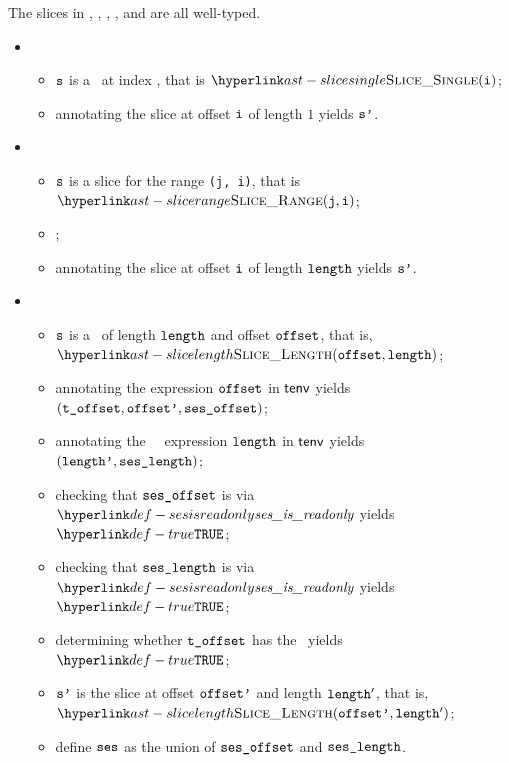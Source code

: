 The slices in
,
,
,
, and
are all well-typed.

\ProseParagraph
\OneApplies
\begin{itemize}
  \item {}
  \begin{itemize}
    \item $\texttt{s}$ is a \singleslice\ at index \vi, that is $\SliceSingle(\vi)$;
    \item annotating the slice at offset $\texttt{i}$ of length $1$ yields $\texttt{s'}$\ProseOrTypeError.
  \end{itemize}

  \item {}
  \begin{itemize}
    \item $\texttt{s}$ is a slice for the range \texttt{(j, i)}, that is $\SliceRange(\vj, \vi)$;
    \item {};
    \item annotating the slice at offset $\texttt{i}$ of length $\texttt{length}$ yields $\texttt{s'}$\ProseOrTypeError.
  \end{itemize}

  \item {}
  \begin{itemize}
    \item $\texttt{s}$ is a \lengthslice\ of length $\texttt{length}$ and offset $\texttt{offset}$, that is, \\
          $\SliceLength(\eoffset, \elength)$;
    \item annotating the expression $\texttt{offset}$ in $\textsf{tenv}$ yields \\
          $(\texttt{t\_offset}, \texttt{offset'}, \texttt{ses\_offset})$\ProseOrTypeError;
    \item annotating the \symbolicallyevaluable\ \constrainedinteger\ expression $\texttt{length}$ in $\textsf{tenv}$ yields
    $(\texttt{length'}, \texttt{ses\_length})$\ProseOrTypeError;
    \item checking that $\texttt{ses\_offset}$ is \readonly{} via $\sesisreadonly$ yields $\True$\ProseOrTypeError;
    \item checking that $\texttt{ses\_length}$ is \readonly{} via $\sesisreadonly$ yields $\True$\ProseOrTypeError;
    \item determining whether $\texttt{t\_offset}$ has the \structureofinteger\ yields $\True$\ProseOrTypeError;
    \item $\texttt{s'}$ is the slice at offset $\texttt{offset'}$ and length $\texttt{length}'$, that is,\\
     $\SliceLength(\eoffsetp, \elength')$;
     \item define $\texttt{ses}$ as the union of $\texttt{ses\_offset}$ and $\texttt{ses\_length}$.
  \end{itemize}


\end{itemize}
